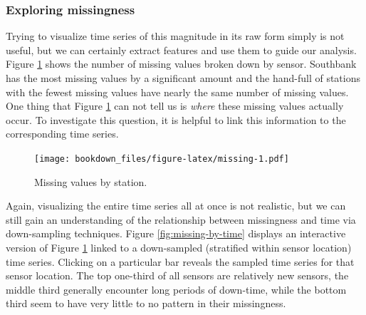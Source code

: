 \documentclass[12pt,]{isuthesis}
\newenvironment{Shaded}{\begin{snugshade}}{\end{snugshade}}
\newcommand{\KeywordTok}[1]{\textcolor[rgb]{0.13,0.29,0.53}{\textbf{{#1}}}}
\newcommand{\DataTypeTok}[1]{\textcolor[rgb]{0.13,0.29,0.53}{{#1}}}
\newcommand{\StringTok}[1]{\textcolor[rgb]{0.31,0.60,0.02}{{#1}}}
\newcommand{\CommentTok}[1]{\textcolor[rgb]{0.56,0.35,0.01}{\textit{{#1}}}}
\newcommand{\NormalTok}[1]{{#1}}
\begin{document}
\begin{Shaded}
\end{Shaded}

\subsubsection{Exploring missingness}\label{exploring-missingness}

Trying to visualize time series of this magnitude in its raw form simply
is not useful, but we can certainly extract features and use them to
guide our analysis. Figure \ref{fig:missing} shows the number of missing
values broken down by sensor. Southbank has the most missing values by a
significant amount and the hand-full of stations with the fewest missing
values have nearly the same number of missing values. One thing that
Figure \ref{fig:missing} can not tell us is \emph{where} these missing
values actually occur. To investigate this question, it is helpful to
link this information to the corresponding time series.

\begin{figure}
\centering
\texttt{[image: bookdown\_files/figure-latex/missing-1.pdf]}
\caption{\label{fig:missing}Missing values by station.}
\end{figure}

Again, visualizing the entire time series all at once is not realistic,
but we can still gain an understanding of the relationship between
missingness and time via down-sampling techniques. Figure
\ref{fig:missing-by-time} displays an interactive version of Figure
\ref{fig:missing} linked to a down-sampled (stratified within sensor
location) time series. Clicking on a particular bar reveals the sampled
time series for that sensor location. The top one-third of all sensors
are relatively new sensors, the middle third generally encounter long
periods of down-time, while the bottom third seem to have very little to
no pattern in their missingness.
\end{document}
